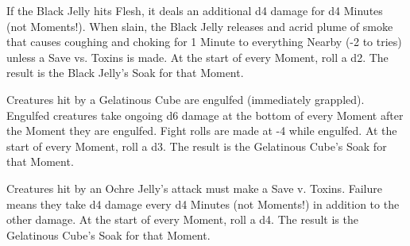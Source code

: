 {


\MONSTERBLOCK[
  Name=Green Slime,
  Link=monster-green-slime,
  MV=n/a,
  WK=d20,
  DMG=d6 1 Close,
  HD=2,
  Power=Average,
  Soak=1,
  Morale=n/a,
  Save=2,
  Extras={Splitting}
]

\MONSTERBLOCK[
  Name=Black Jelly,
  Link=monster-black-jelly,
  MV=n/a,
  WK=d20,
  DMG=2d4 1 Close,
  HD=3,
  Power=Average,
  Soak=varies,
  Morale=n/a,
  Save=2,
  Extras={Acidic}
]

If the Black Jelly hits Flesh, it deals an additional d4 damage for d4 Minutes (not Moments!).  When slain, the Black Jelly releases and acrid plume of smoke that causes coughing and choking for 1 Minute to everything Nearby (-2 to \RO tries) unless a Save vs. Toxins is made.
At the start of every Moment, roll a d2.  The result is the Black Jelly's Soak for that Moment.

\MONSTERBLOCK[
  Name=Gelatinous Cube,
  Link=monster-gelatinous-cube,
  MV=Slow,
  WK=d16,
  DMG=d10 All Close,
  HD=4,
  Power=Average,
  Soak=varies,
  Morale=n/a,
  Save=3,
  Extras={}
]
Creatures hit by a Gelatinous Cube are engulfed (immediately grappled).  Engulfed creatures take ongoing d6 damage at the bottom of every Moment after the Moment they are engulfed.  Fight \RO rolls are made at -4 while engulfed.
At the start of every Moment, roll a d3.  The result is the Gelatinous Cube's Soak for that Moment.

\MONSTERBLOCK[
  Name=Ochre Jelly,
  Link=monster-ochre-jelly,
  MV=n/a,
  WK=d16,
  DMG=d12 3 Nearby,
  HD=5,
  Power=Average,
  Soak=varies,
  Morale=n/a,
  Save=3,
  Extras={}
]
Creatures hit by an Ochre Jelly's attack must make a Save v. Toxins.  Failure means they take d4 damage every d4 Minutes (not Moments!) in addition to the other damage.
At the start of every Moment, roll a d4.  The result is the Gelatinous Cube's Soak for that Moment.

\newpage



\MONSTERBLOCK[
  Name=Ghoul,
  Link=monster-ghoul,
  MV=Fast,
  WK=d20,
  DMG=d6 2 Close,
  HD=2,
  Power=Average,
  Soak=0,
  Morale=Cowardly,
  Save=2,
  Extras={Keen,  Nocturnal}
]

}
